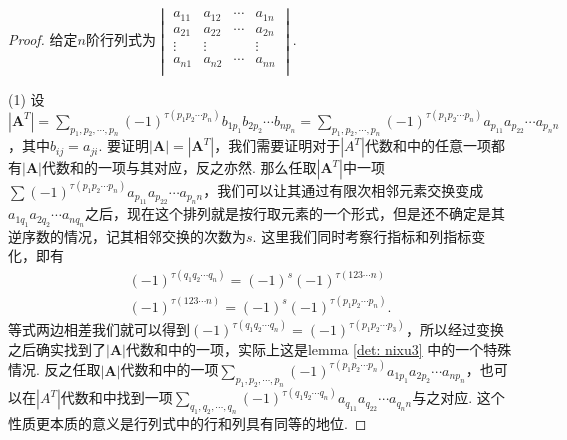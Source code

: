 \documentclass{article}
\begin{document}
\begin{proof}
给定$n$阶行列式为$\begin{vmatrix}
a_{11} & a_{12} & \cdots & a_{1n} \\
a_{21} & a_{22} & \cdots & a_{2n} \\
\vdots & \vdots & 		 & \vdots \\
a_{n1} & a_{n2} & \cdots & a_{nn} \\
\end{vmatrix}$.

{\color{red}(1)} 设$|\mathbf{A}^T|=\sum\limits_{p_1,p_2,\cdots,p_n} (-1)^{\tau(p_1p_2\cdots p_n)} b_{1p_1}b_{2p_2}\cdots b_{np_n} = \sum\limits_{p_1,p_2,\cdots,p_n} (-1)^{\tau(p_1p_2\cdots p_n)} a_{p_11}a_{p_22}\cdots a_{p_nn}$，其中$b_{ij} = a_{ji}$. 要证明$|\mathbf{A}| = |\mathbf{A}^T|$，{\color{blue}我们需要证明对于$|A^T|$代数和中的任意一项都有$|\mathbf{A}|$代数和的一项与其对应，反之亦然}. 那么任取$|\mathbf{A}^T|$中一项$\sum\limits (-1)^{\tau(p_1p_2\cdots p_n)} a_{p_11}a_{p_22}\cdots a_{p_nn}$，我们可以让其通过有限次相邻元素交换变成$a_{1q_1}a_{2q_2}\cdots a_{nq_n}$之后，现在这个排列就是按行取元素的一个形式，但是还不确定是其逆序数的情况，记其相邻交换的次数为$s$. 这里我们同时考察行指标和列指标变化，即有
$$
\begin{array}{ll}
(-1)^{\tau(q_1q_2\cdots q_n)} = (-1)^{s} (-1)^{\tau(123\cdots n)} \\
(-1)^{\tau(123\cdots n)} = (-1)^{s} (-1)^{\tau(p_1p_2\cdots p_n)}.
\end{array}
$$ 
等式两边相差我们就可以得到$(-1)^{\tau(q_1q_2\cdots q_n)} = (-1)^{\tau(p_1p_2\cdots p_3)}$，所以经过变换之后确实找到了$|\mathbf{A}|$代数和中的一项，实际上这是lemma \ref{det: nixu3} 中的一个特殊情况. 反之任取$|\mathbf{A}|$代数和中的一项$\sum\limits_{p_1,p_2,\cdots,p_n}(-1)^{\tau(p_1p_2\cdots p_n)}a_{1p_1}a_{2p_2}\cdots a_{np_n}$，也可以在$|A^T|$代数和中找到一项$\sum\limits_{q_1,q_2,\cdots,q_n}(-1)^{\tau(q_1q_2\cdots q_n)}a_{q_11}a_{q_22}\cdots a_{q_nn}$与之对应. {\color{blue}这个性质更本质的意义是行列式中的行和列具有同等的地位}.



\end{proof}
\end{document}
